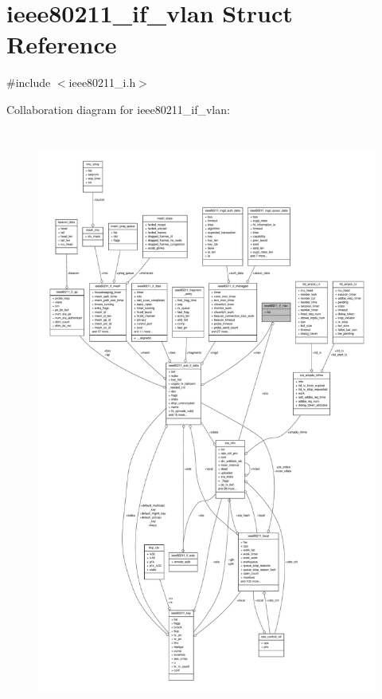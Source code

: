 \hypertarget{structieee80211__if__vlan}{\section{ieee80211\-\_\-if\-\_\-vlan Struct Reference}
\label{structieee80211__if__vlan}
}


{\ttfamily \#include $<$ieee80211\-\_\-i.\-h$>$}



Collaboration diagram for ieee80211\-\_\-if\-\_\-vlan\-:
\nopagebreak
\begin{figure}[H]
\begin{center}
\leavevmode
\includegraphics[height=550pt]{structieee80211__if__vlan__coll__graph}
\end{center}
\end{figure}
